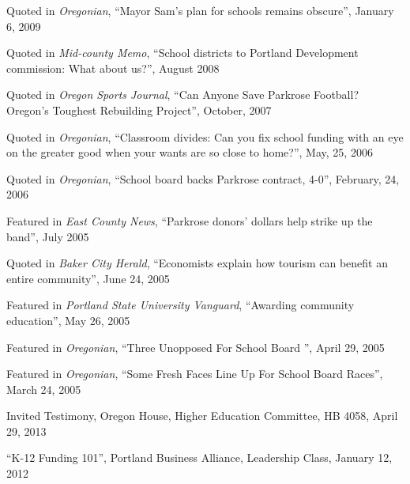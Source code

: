 \documentclass[Computer Science]{vita}
\begin{document}
\begin{vita}
\begin{Selected Media Outreach}
  \item Quoted in \emph{Oregonian}, ``Mayor Sam's plan for schools
    remains obscure'', January 6, 2009

  \item Quoted in \emph{Mid-county Memo}, ``School districts to
    Portland Development commission: What about us?'', August 2008

  \item Quoted in \emph{Oregon Sports Journal}, ``Can Anyone Save
    Parkrose Football?  Oregon's Toughest Rebuilding Project'',
    October, 2007

  \item Quoted in \emph{Oregonian}, ``Classroom divides: Can you fix
    school funding with an eye on the greater good when your wants are
    so close to home?'', May, 25, 2006

  \item Quoted in \emph{Oregonian}, ``School board backs Parkrose
    contract, 4-0'', February, 24, 2006

  \item Featured in \emph{East County News}, ``Parkrose donors'
    dollars help strike up the band'', July 2005

  \item Quoted in \emph{Baker City Herald}, ``Economists explain how
    tourism can benefit an entire community'', June 24, 2005
	
  \item Featured in \emph{Portland State University Vanguard},
    ``Awarding community education'', May 26, 2005
	
  \item Featured in \emph{Oregonian}, ``Three Unopposed For School
    Board '', April 29, 2005
	
  \item Featured in \emph{Oregonian}, ``Some Fresh Faces Line Up For
    School Board Races'', March 24, 2005

  \end{Selected Media Outreach}

  \begin{Selected Community Outreach}
  
  \item Invited Testimony, Oregon House, Higher Education Committee, HB 4058, April 29, 2013

\item ``K-12 Funding 101'', Portland Business Alliance, Leadership Class, January 12, 2012


\end{Selected Community Outreach}
\end{vita}
\end{document}
